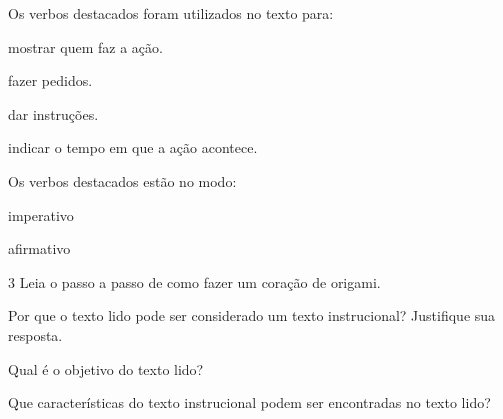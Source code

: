 \begin{escolha}
\begin{escolha}
\item
  Os verbos destacados foram utilizados no texto para:

\begin{boxlist}
\boxitem[] mostrar quem faz a ação.

\boxitem[\rosa{X}] fazer pedidos.

\boxitem[] dar instruções.

\boxitem[] indicar o tempo em que a ação acontece.
\end{boxlist}

\item
  Os verbos destacados estão no modo:

\begin{boxlist}
\boxitem[\rosa{X}] imperativo

\boxitem[] afirmativo
\end{boxlist}

\end{escolha}

\num{3} Leia o passo a passo de como fazer um coração de origami.



\begin{escolha}
\item Por que o texto lido pode ser considerado um texto instrucional? Justifique sua resposta.


\item Qual é o objetivo do texto lido?


\item Que características do texto instrucional podem ser encontradas no texto lido?



\end{escolha}
\end{escolha}
